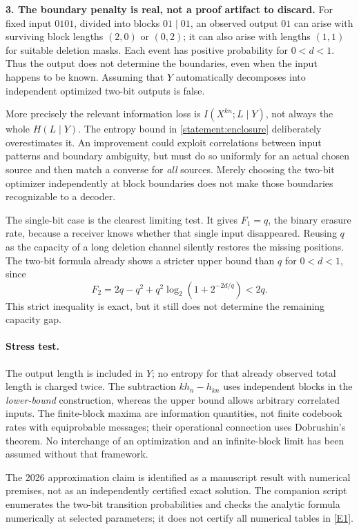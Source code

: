 \documentclass[11pt,a4paper]{article}
\newcommand{\eref}[2]{\hyperlink{extra:#1:#2}{[E#2]}}
\numberwithin{equation}{section}
\begin{document}
\textbf{3. The boundary penalty is real, not a proof artifact to discard.}
For fixed input $0101$, divided into blocks $01\mid01$, an observed
output $01$ can arise with surviving block lengths $(2,0)$ or $(0,2)$;
it can also arise with lengths $(1,1)$ for suitable deletion masks.
Each event has positive probability for $0<d<1$.
Thus the output does not determine the boundaries, even when the input
happens to be known. Assuming that $Y$ automatically decomposes into
independent optimized two-bit outputs is false.

More precisely the relevant information loss is
$I(X^{kn};L\mid Y)$, not always the whole $H(L\mid Y)$.
The entropy bound in \eqref{statement:enclosure} deliberately overestimates it.
An improvement could exploit correlations between input patterns and
boundary ambiguity, but must do so uniformly for an actual chosen
source and then match a converse for \emph{all} sources. Merely choosing
the two-bit optimizer independently at block boundaries does not make
those boundaries recognizable to a decoder.

The single-bit case is the clearest limiting test. It gives
$F_1=q$, the binary erasure rate, because a receiver knows whether that
single input disappeared. Reusing $q$ as the capacity of a long deletion
channel silently restores the missing positions. The two-bit formula
already shows a stricter upper bound than $q$ for $0<d<1$, since
\[
 F_2=2q-q^2+q^2\log_2(1+2^{-2d/q})<2q.
\]
This strict inequality is exact, but it still does not determine the
remaining capacity gap.

\paragraph{Stress test.}
The output length is included in $Y$; no entropy for that already
observed total length is charged twice. The subtraction
$kh_n-h_{kn}$ uses independent blocks in the \emph{lower-bound}
construction, whereas the upper bound allows arbitrary correlated
inputs. The finite-block maxima are information quantities, not finite
codebook rates with equiprobable messages; their operational connection
uses Dobrushin's theorem. No interchange of an optimization and an
infinite-block limit has been assumed without that framework.

The 2026 approximation claim is identified as a manuscript result with
numerical premises, not as an independently certified exact solution.
The companion script enumerates the two-bit transition probabilities
and checks the analytic formula numerically at selected parameters; it
does not certify all numerical tables in \eref{statement}{1}.
\end{document}
